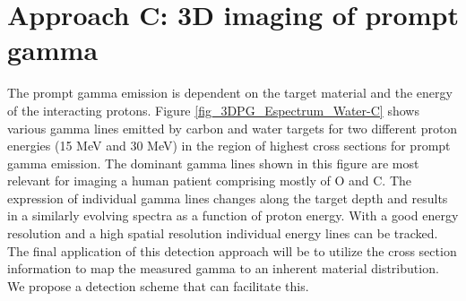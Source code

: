 \documentclass[11pt,a4paper]{article}
\begin{document}
%
%


\section{Approach C: 3D imaging of prompt gamma\label{3DPG}} 
\label{section_3DPG}

The prompt gamma emission is dependent on the target material and the energy of the interacting protons. Figure \ref{fig_3DPG_Espectrum_Water-C} shows various gamma lines emitted by carbon and water targets for two different proton energies (15 MeV and 30 MeV) in the region of highest cross sections for prompt gamma emission. The dominant gamma lines shown in this figure are most relevant for imaging a human patient comprising mostly of O and C. The expression of individual gamma lines changes along the target depth and results in a similarly evolving spectra as a function of proton energy. With a good energy resolution and a high spatial resolution individual energy lines can be tracked. The final application of this detection approach will be to utilize the cross section information to map the measured gamma to an inherent material distribution. We propose a detection scheme that can facilitate this. 
\end{document}
